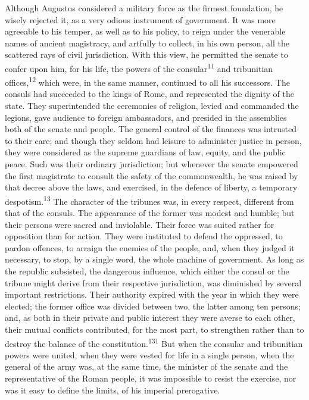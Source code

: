 Although Augustus considered a military force as the firmest
foundation, he wisely rejected it, as a very odious instrument of
government. It was more agreeable to his temper, as well as to
his policy, to reign under the venerable names of ancient
magistracy, and artfully to collect, in his own person, all the
scattered rays of civil jurisdiction. With this view, he
permitted the senate to confer upon him, for his life, the powers
of the consular\textsuperscript{11} and tribunitian offices,\textsuperscript{12} which were, in the
same manner, continued to all his successors. The consuls had
succeeded to the kings of Rome, and represented the dignity of
the state. They superintended the ceremonies of religion, levied
and commanded the legions, gave audience to foreign ambassadors,
and presided in the assemblies both of the senate and people. The
general control of the finances was intrusted to their care; and
though they seldom had leisure to administer justice in person,
they were considered as the supreme guardians of law, equity, and
the public peace. Such was their ordinary jurisdiction; but
whenever the senate empowered the first magistrate to consult the
safety of the commonwealth, he was raised by that decree above
the laws, and exercised, in the defence of liberty, a temporary
despotism.\textsuperscript{13} The character of the tribunes was, in every
respect, different from that of the consuls. The appearance of
the former was modest and humble; but their persons were sacred
and inviolable. Their force was suited rather for opposition than
for action. They were instituted to defend the oppressed, to
pardon offences, to arraign the enemies of the people, and, when
they judged it necessary, to stop, by a single word, the whole
machine of government. As long as the republic subsisted, the
dangerous influence, which either the consul or the tribune might
derive from their respective jurisdiction, was diminished by
several important restrictions. Their authority expired with the
year in which they were elected; the former office was divided
between two, the latter among ten persons; and, as both in their
private and public interest they were averse to each other, their
mutual conflicts contributed, for the most part, to strengthen
rather than to destroy the balance of the constitution.\textsuperscript{131} But
when the consular and tribunitian powers were united, when they
were vested for life in a single person, when the general of the
army was, at the same time, the minister of the senate and the
representative of the Roman people, it was impossible to resist
the exercise, nor was it easy to define the limits, of his
imperial prerogative.

